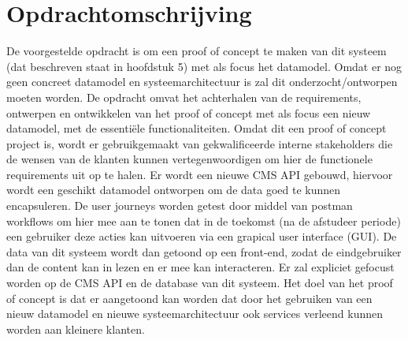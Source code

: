 \section{Opdrachtomschrijving}
De voorgestelde opdracht is om een proof of concept te maken van dit systeem (dat beschreven staat in
hoofdstuk 5) met als focus het datamodel. Omdat er nog geen concreet datamodel en systeemarchitectuur
is zal dit onderzocht/ontworpen moeten worden.
\whitespace
De opdracht omvat het achterhalen van de requirements, ontwerpen en ontwikkelen van het proof of
concept met als focus een nieuw datamodel, met de essentiële functionaliteiten. Omdat dit een proof of
concept project is, wordt er gebruikgemaakt van gekwalificeerde interne stakeholders die de wensen van
de klanten kunnen vertegenwoordigen om hier de functionele requirements uit op te halen.
\whitespace
Er wordt een nieuwe CMS API gebouwd, hiervoor wordt een geschikt datamodel ontworpen om de data
goed te kunnen encapsuleren. De user journeys worden getest door middel van postman workflows om
hier mee aan te tonen dat in de toekomst (na de afstudeer periode) een gebruiker deze acties kan uitvoeren
via een grapical user interface (GUI).
\whitespace
De data van dit systeem wordt dan getoond op een front-end, zodat de eindgebruiker dan de content kan in
lezen en er mee kan interacteren. Er zal expliciet gefocust worden op de CMS API en de database van dit
systeem.
\whitespace
Het doel van het proof of concept is dat er aangetoond kan worden dat door het gebruiken van een nieuw
datamodel en nieuwe systeemarchitectuur ook services verleend kunnen worden aan kleinere klanten.
